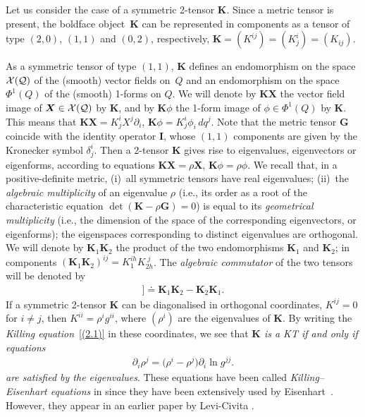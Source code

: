 \documentclass[pdftex]{sigma}
\def\bs{\boldsymbol}
\numberwithin{equation}{section}
\begin{document}
Let us consider the case of a symmetric 2-tensor $\bs K$. Since a metric tensor is present, the boldface object~$\bs K$ can be represented in components as a tensor of type $(2,0)$, $(1,1)$ and $(0,2)$, respectively, $\bs K= (K^{ij})=(K^i_j)=(K_{ij})$.

As a symmetric tensor of type $(1,1)$, $\bs K$ def\/ines an endomorphism on the space $\cal X(Q)$ of the (smooth) vector f\/ields on~$Q$ and an endomorphism on the space $\Phi^1(Q)$ of the (smooth) 1-forms on $Q$. We will denote by
$\bs K\bs X$ the vector f\/ield image of $\bs X\in\cal X(Q)$ by $\bs K$, and by $\bs K\phi$ the 1-form
image of $\phi\in\Phi^1(Q)$ by $\bs K$. This means that $\bs K\bs X=K^i_jX^j \partial_i$, $\bs K\phi= K^i_j\phi_i\,dq^j$.
Note that the metric tensor $\bs G$ coincide with the identity operator $\bs I$,
whose $(1,1)$ components are given by the Kronecker symbol $\delta^i_j$.
Then a 2-tensor $\bs K$ gives rise to eigenvalues, eigenvectors or eigenforms, according to equations
$\bs K\bs X=\rho\bs X$, $\bs K\phi=\rho \phi$. We recall that, in a positive-def\/inite metric, (i)~all symmetric tensors have real eigenvalues; (ii)~the {\it algebraic multiplicity} of an eigenvalue $\rho$ (i.e., its order as a root of the characteristic equation $\det(\bs K-\rho\bs G)=0$) is equal to its {\it geometrical multiplicity}
(i.e., the dimension of the space of the corresponding eigenvectors, or eigenforms); the eigenspaces corresponding to distinct eigenvalues are orthogonal. We will denote by $\bs K_1\bs K_2$ the product of the two endomorphisms $\bs K_1$ and $\bs K_2$; in components $(\bs K_1\bs K_2)^{ij}=K_1^{ih}K_{2h}^{\;j}$. The {\it algebraic commutator} of the two tensors will be denoted by
\begin{gather*}
[ \! [\bs K_1,\bs K_2] \! ]\doteq \bs K_1\bs K_2-\bs K_2\bs K_1.
\end{gather*}
If a symmetric 2-tensor $\bs K$ can be diagonalised in orthogonal coordinates, $K^{ij}=0$ for $i\neq j$, then $K^{ii}=\rho^i g^{ii}$, where $(\rho^i)$ are the eigenvalues of $\bs K$. By writing the {\it Killing equation}~\eqref{(2.1)} in these coordinates, we see that {\it $\bs K$ is a KT if and only if
equations
\begin{gather}
\partial_i\rho^j=\big(\rho^i-\rho^j\big) \partial_i \ln g^{jj}.
\label{(2.2)}
\end{gather}
are satisf\/ied by the eigenvalues}. These equations have been called  {\it Killing--Eisenhart equations} in \cite{BCR-2002a} since they have been extensively used by Eisenhart~\cite{Eisenhart-1949}. However, they appear in an earlier paper by Levi-Civita \cite[p.~285]{LC-1896}.
\end{document}
